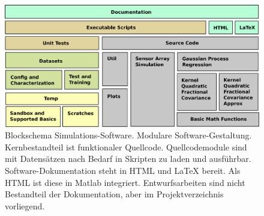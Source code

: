\vspace{3mm}
\begin{figure}[bph]
	\centering
	\includegraphics[width=\linewidth]{chapters/images/3-SW-E-OExp/Blockschema_Software}
	\caption[Blockschema Simulations-Software]{Blockschema Simulations-Software. Modulare Software-Gestaltung. Kernbestandteil ist funktionaler Quellcode. Quellcodemodule sind mit Datensätzen nach Bedarf in Skripten zu laden und ausführbar. Software-Dokumentation steht in HTML und LaTeX bereit. Als HTML ist diese in Matlab integriert. Entwurfsarbeiten sind nicht Bestandteil der Dokumentation, aber im Projektverzeichnis vorliegend.}
	\label{fig:blockschemasoftware}
\end{figure}


\clearpage
